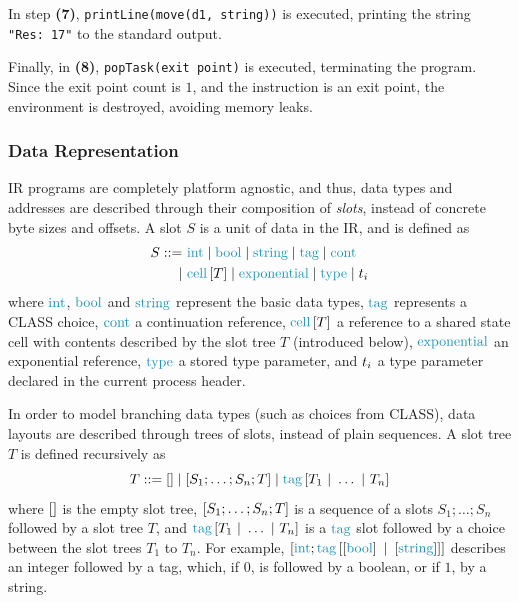 \documentclass[sigconf,nonacm,natbib=true]{acmart}
\begin{document}
In step \textbf{(7)}, \texttt{printLine(move(d1, string))} is executed, printing the string \texttt{"Res:\ 17"} to the standard output.

Finally, in \textbf{(8)}, \texttt{popTask(exit point)} is executed, terminating the program. Since the exit point count is $1$, and the instruction is an exit point, the environment is destroyed, avoiding memory leaks.

\begin{center}
\end{center}

\subsubsection{Data Representation} \label{subsubsection:IRSlots}

\ac{IR} programs are completely platform agnostic, and thus, data types and addresses are described through their composition of \textit{slots}, instead of concrete byte sizes and offsets. A slot $S$ is a unit of data in the \ac{IR}, and is defined as
\[\begin{aligned}
S ::= &\ \ints \mid \bools \mid \strings \mid \tags \mid \conts\\\mid&\ \cells{T} \mid \exponentials \mid \types \mid \vars{i}\end{aligned}\]
where $\ints$, $\bools$ and $\strings$ represent the basic data types, $\tags$ represents a \ac{CLASS} choice, $\conts$ a continuation reference, $\cells{T}$ a reference to a shared state cell with contents described by the slot tree $T$ (introduced below), $\exponentials$ an exponential reference, $\types$ a stored type parameter, and $t_{i}$ a type parameter declared in the current process header. 

In order to model branching data types (such as choices from \ac{CLASS}), data layouts are described through trees of slots, instead of plain sequences. A slot tree $T$ is defined recursively as
\[
T ::= \nilst \mid \seqst{S_1; \dots; S_n; T} \mid \tagst{T_1 \tagsepst \dots \tagsepst T_n}
\]
where $\left[\right]$ is the empty slot tree, $\left[S_1; \dots; S_n; T\right]$ is a sequence of a slots $S_1; \dots; S_n$ followed by a slot tree $T$, and $\tagst{T_1 \tagsepst \dots \tagsepst T_n}$ is a $\tags$ slot followed by a choice between the slot trees $T_1$ to $T_n$. For example, $\seqst{\ints; \tagst{\seqst{\bools} \tagsepst \seqst{\strings}}}$ describes an integer followed by a tag, which, if $0$, is followed by a boolean, or if $1$, by a string.
\end{document}
